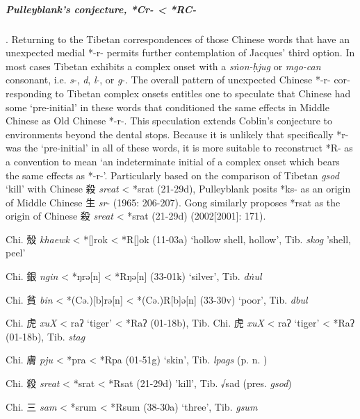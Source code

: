 \subparagraph{Pulleyblank's conjecture, *Cr- \textless{} *RC-}.
Returning to the Tibetan correspondences of those Chinese words that
have an unexpected medial *-r- permits further contemplation of Jacques'
third option. In most cases Tibetan exhibits a complex onset with a {} \emph{sṅon-ḥjug} or {} \emph{mgo-can} consonant, i.e.
 \emph{s}-,  \emph{d},  \emph{l}-, or \emph{g}-. The overall pattern of
unexpected Chinese *-r- cor­re­sponding to Tibetan complex onsets
entitles one to speculate that Chinese had some `pre-initial' in these
words that conditioned the same effects in Middle Chinese as Old Chinese
*-r-. This speculation extends Coblin's conjecture to environments
beyond the dental stops. Because it is unlikely that specifically *r-
was the `pre-initial' in all of these words, it is more suitable to
reconstruct *R- as a convention to mean `an indeterminate initial of a
complex onset which bears the same effects as *-r-'. Particularly based
on the comparison of Tibetan {} \emph{gsod} `kill' with Chinese 殺
 \emph{sreat} \textless{} *srat (21-29d), Pulleyblank posits *ks- as an
origin of Middle Chinese 生 \emph{sr}- (1965: 206-207). Gong similarly
proposes *rsat as the origin of Chinese 殺 \emph{sreat} \textless{}
*srat (21-29d) (2002{[}2001]: 171).

\begin{description} \item
Chi. 殼  \emph{khaewk} \textless{} *[{}]{}rok \textless{}
*R{[}{}]{}ok (11-03a) `hollow shell, hollow', Tib. {} \emph{skog}
'shell, peel'
\item
Chi. 銀  \emph{ngin} \textless{} *ŋrə[n] \textless{} *Rŋə[n]
(33-01k) `silver', Tib. {} \emph{dṅul}
\item
Chi. 貧  \emph{bin} \textless{} *(Cə.){[}b]rə[n] \textless{}
*(Cə.)R{[}b]ə[n] (33-30v) `poor', Tib. {} \emph{dbul}
\item
Chi. 虎  \emph{xuX} \textless{} {}{}raʔ `tiger' \textless{} *R{}{}aʔ
(01-18b), 
Tib. 
Chi. 虎 \emph{xuX}
\textless{} {}{}raʔ `tiger' \textless{} *R{}{}aʔ (01-18b), Tib. {} \emph{stag}
\item
Chi. 膚  \emph{pju} \textless{} *pra \textless{} *Rpa (01-51g) `skin',
Tib. {} \emph{lpags} (p. n. )
\item
Chi. 殺  \emph{sreat} \textless{} *srat \textless{} *Rsat (21-29d)
'kill', Tib. √sad (pres. {} \emph{gsod})
\item
Chi. 三  \emph{sam} \textless{} *srum \textless{} *Rsum (38-30a) `three',
Tib. {} \emph{gsum}
\end{description}

